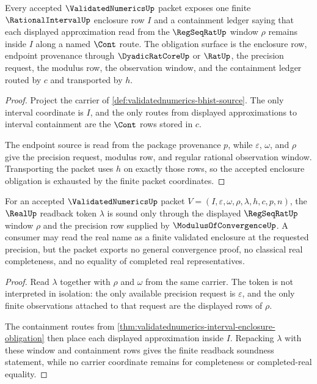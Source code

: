 \begin{theorem}
\label{thm:validatednumerics-interval-enclosure-obligation}
Every accepted $\ValidatedNumericsUp$ packet exposes one finite
$\RationalIntervalUp$ enclosure row $I$ and a containment ledger saying that
each displayed approximation read from the $\RegSeqRatUp$ window $\rho$
remains inside $I$ along a named $\Cont$ route. The obligation surface is the
enclosure row, endpoint provenance through $\DyadicRatCoreUp$ or $\RatUp$,
the precision request, the modulus row, the observation window, and the
containment ledger routed by $c$ and transported by $h$.
\end{theorem}
\begin{proof}
Project the carrier of
\autoref{def:validatednumerics-bhist-source}. The only interval coordinate is
$I$, and the only routes from displayed approximations to interval
containment are the $\Cont$ rows stored in $c$.

The endpoint source is read from the package provenance $p$, while
$\varepsilon$, $\omega$, and $\rho$ give the precision request, modulus row,
and regular rational observation window. Transporting the packet uses $h$ on
exactly those rows, so the accepted enclosure obligation is exhausted by the
finite packet coordinates.
\end{proof}

\begin{theorem}
\label{thm:validatednumerics-real-readback-soundness}
For an accepted $\ValidatedNumericsUp$ packet
$V=(I,\varepsilon,\omega,\rho,\lambda,h,c,p,n)$, the $\RealUp$ readback token
$\lambda$ is sound only through the displayed $\RegSeqRatUp$ window $\rho$ and
the precision row supplied by $\ModulusOfConvergenceUp$. A consumer may read
the real name as a finite validated enclosure at the requested precision, but
the packet exports no general convergence proof, no classical real
completeness, and no equality of completed real representatives.
\end{theorem}
\begin{proof}
Read $\lambda$ together with $\rho$ and $\omega$ from the same carrier. The
token is not interpreted in isolation: the only available precision request
is $\varepsilon$, and the only finite observations attached to that request
are the displayed rows of $\rho$.

The containment routes from
\autoref{thm:validatednumerics-interval-enclosure-obligation} then place each
displayed approximation inside $I$. Repacking $\lambda$ with these window and
containment rows gives the finite readback soundness statement, while no
carrier coordinate remains for completeness or completed-real equality.
\end{proof}

